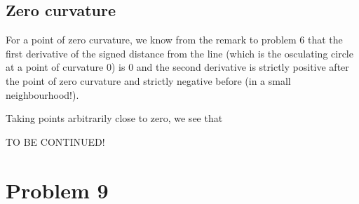 \subsection{Zero curvature}

For a point of zero curvature, we know from the remark to problem 6 that the first derivative of the signed distance from the line (which is the osculating circle at a point of curvature 0) is 0 and the second derivative is strictly positive after the point of zero curvature and strictly negative before (in a small neighbourhood!).

Taking points arbitrarily close to zero, we see that

TO BE CONTINUED!


\section*{Problem 9}
